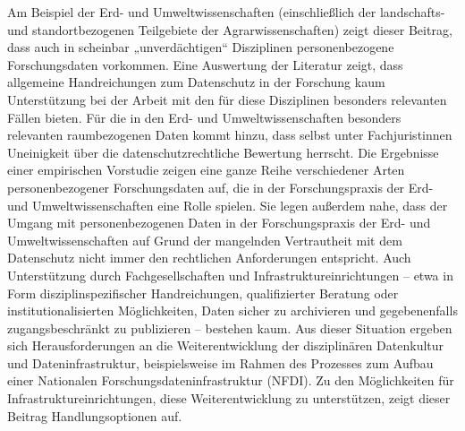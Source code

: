 Am Beispiel der Erd- und Umweltwissenschaften (einschließlich der
landschafts- und standortbezogenen Teilgebiete der Agrarwissenschaften)
zeigt dieser Beitrag, dass auch in scheinbar „unverdächtigen``
Disziplinen personenbezogene Forschungsdaten vorkommen. Eine Auswertung
der Literatur zeigt, dass allgemeine Handreichungen zum Datenschutz in
der Forschung kaum Unterstützung bei der Arbeit mit den für diese
Disziplinen besonders relevanten Fällen bieten. Für die in den Erd- und
Umweltwissenschaften besonders relevanten raumbezogenen Daten kommt
hinzu, dass selbst unter Fachjuristinnen Uneinigkeit über die
datenschutzrechtliche Bewertung herrscht. Die Ergebnisse einer
empirischen Vorstudie zeigen eine ganze Reihe verschiedener Arten
personenbezogener Forschungsdaten auf, die in der Forschungspraxis der
Erd- und Umweltwissenschaften eine Rolle spielen. Sie legen außerdem
nahe, dass der Umgang mit personenbezogenen Daten in der
Forschungspraxis der Erd- und Umweltwissenschaften auf Grund der
mangelnden Vertrautheit mit dem Datenschutz nicht immer den rechtlichen
Anforderungen entspricht. Auch Unterstützung durch Fachgesellschaften
und Infrastruktureinrichtungen -- etwa in Form disziplinspezifischer
Handreichungen, qualifizierter Beratung oder institutionalisierten
Möglichkeiten, Daten sicher zu archivieren und gegebenenfalls
zugangsbeschränkt zu publizieren -- bestehen kaum. Aus dieser Situation
ergeben sich Herausforderungen an die Weiterentwicklung der
disziplinären Datenkultur und Dateninfrastruktur, beispielsweise im
Rahmen des Prozesses zum Aufbau einer Nationalen
Forschungsdateninfrastruktur (NFDI). Zu den Möglichkeiten für
Infrastruktureinrichtungen, diese Weiterentwicklung zu unterstützen,
zeigt dieser Beitrag Handlungsoptionen auf.
